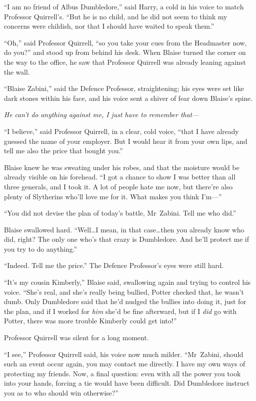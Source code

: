 “I am no friend of Albus Dumbledore,” said Harry, a cold in his voice to match
Professor Quirrell’s. “But he is no child, and he did not seem to think my
concerns were childish, nor that I should have waited to speak them.”

“Oh,” said Professor Quirrell, “so you take your cues from the Headmaster now,
do you?” and stood up from behind his desk.
\later
When Blaise turned the corner on the way to the office, he saw that Professor
Quirrell was already leaning against the wall.

“Blaise Zabini,” said the Defence Professor, straightening; his eyes were set
like dark stones within his face, and his voice sent a shiver of fear down
Blaise’s spine.

\emph{He can’t do anything against me, I just have to remember that—}

“I believe,” said Professor Quirrell, in a clear, cold voice, “that I have
already guessed the name of your employer. But I would hear it from your own
lips, and tell me also the price that bought you.”

Blaise knew he was sweating under his robes, and that the moisture would be
already visible on his forehead. “I got a chance to show I was better than all
three generals, and I took it. A lot of people hate me now, but there’re also
plenty of Slytherins who’ll love me for it. What makes you think I’m—”

“You did not devise the plan of today’s battle, Mr~Zabini. Tell me who did.”

Blaise swallowed hard. “Well…I mean, in that case…then you
already know who did, right? The only one who’s that crazy is Dumbledore. And
he’ll protect me if you try to do anything.”

“Indeed. Tell me the price.” The Defence Professor’s eyes were still hard.

“It’s my cousin Kimberly,” Blaise said, swallowing again and trying to control
his voice. “She’s real, and she’s really being bullied, Potter checked that, he
wasn’t dumb. Only Dumbledore said that he’d nudged the bullies into doing it,
just for the plan, and if I worked for \emph{him} she’d be fine afterward, but
if I \emph{did} go with Potter, there was more trouble Kimberly could get into!”

Professor Quirrell was silent for a long moment.

“I see,” Professor Quirrell said, his voice now much milder. “Mr~Zabini,
should such an event occur again, you may contact me directly. I have my own
ways of protecting my friends. Now, a final question: even with all the power
you took into your hands, forcing a tie would have been difficult. Did
Dumbledore instruct you as to who should win otherwise?”

